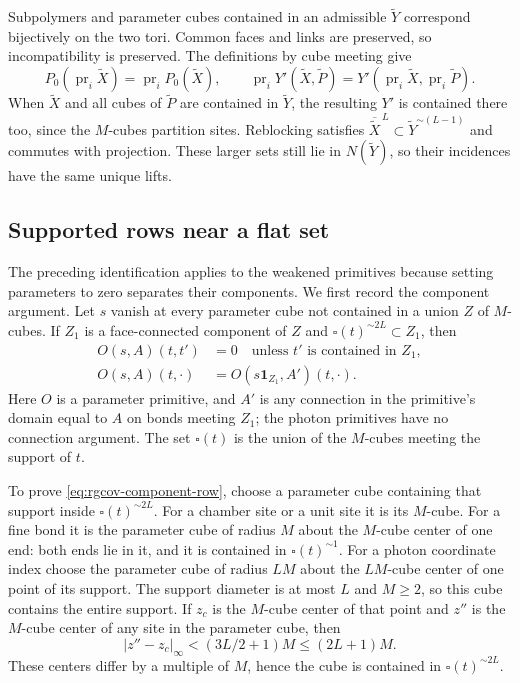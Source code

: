 Subpolymers and parameter cubes contained in an
admissible $\widetilde Y$ correspond bijectively
on the two tori. Common faces and links are
preserved, so incompatibility is preserved.
The definitions by cube meeting give
\[
 P_0(\operatorname{pr}_i\widetilde X)
                 =\operatorname{pr}_iP_0(\widetilde X),\qquad
 \operatorname{pr}_iY'(\widetilde X,\widetilde P)
          =Y'(\operatorname{pr}_i\widetilde X,\operatorname{pr}_i\widetilde P).
\]
When $\widetilde X$ and all cubes of $\widetilde P$
are contained in $\widetilde Y$, the resulting
$Y'$ is contained there too, since the $M$-cubes
partition sites. Reblocking satisfies
$\overline{\widetilde X}^{\,L}
\subset\widetilde Y^{\sim(L-1)}$ and commutes with
projection. These larger sets still lie in
$N(\widetilde Y)$, so their incidences have the
same unique lifts.

\subsection{Supported rows near a flat set}
\label{subsec:rgcov-supported-rows}

The preceding identification applies to the weakened
primitives because setting parameters to zero separates
their components. We first record the component argument.
Let $s$ vanish at every parameter cube not contained
in a union $Z$ of $M$-cubes. If $Z_1$ is a face-connected
component of $Z$ and
$\square(t)^{\sim2L}\subset Z_1$, then
\begin{equation}\label{eq:rgcov-component-row}
 \begin{split}
 O(s,A)(t,t')&=0 \quad\text{unless }t'\text{ is contained in }Z_1,\\
 O(s,A)(t,\cdot)&=O(s\mathbf1_{Z_1},A')(t,\cdot).
 \end{split}
\end{equation}
Here $O$ is a parameter primitive, and $A'$ is any
connection in the primitive's domain equal to $A$ on bonds meeting $Z_1$;
the photon primitives have no connection argument.
The set $\square(t)$ is the union of the $M$-cubes
meeting the support of $t$.

To prove \eqref{eq:rgcov-component-row}, choose a parameter
cube containing that support inside
$\square(t)^{\sim2L}$. For a chamber site or a unit site
it is its $M$-cube. For a fine bond it is the parameter
cube of radius $M$ about the $M$-cube center of one end:
both ends lie in it, and it is contained in
$\square(t)^{\sim1}$. For a photon coordinate index choose
the parameter cube of radius $LM$ about the $LM$-cube
center of one point of its support.
The support diameter is at most $L$ and $M\ge2$,
so this cube contains the entire support.
If $z_c$ is the $M$-cube center of that point and $z''$
is the $M$-cube center of any site in the parameter cube,
then
\[
 |z''-z_c|_\infty
 <(3L/2+1)M\le(2L+1)M.
\]
These centers differ by a multiple of $M$, hence the
cube is contained in $\square(t)^{\sim2L}$.

